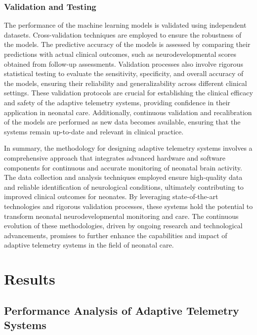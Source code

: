 \documentclass[12pt,journal,compsoc]{IEEEtran}
\begin{document}
\subsubsection{Validation and Testing}

The performance of the machine learning models is validated using independent datasets. Cross-validation techniques are employed to ensure the robustness of the models. The predictive accuracy of the models is assessed by comparing their predictions with actual clinical outcomes, such as neurodevelopmental scores obtained from follow-up assessments. Validation processes also involve rigorous statistical testing to evaluate the sensitivity, specificity, and overall accuracy of the models, ensuring their reliability and generalizability across different clinical settings. These validation protocols are crucial for establishing the clinical efficacy and safety of the adaptive telemetry systems, providing confidence in their application in neonatal care. Additionally, continuous validation and recalibration of the models are performed as new data becomes available, ensuring that the systems remain up-to-date and relevant in clinical practice.

In summary, the methodology for designing adaptive telemetry systems involves a comprehensive approach that integrates advanced hardware and software components for continuous and accurate monitoring of neonatal brain activity. The data collection and analysis techniques employed ensure high-quality data and reliable identification of neurological conditions, ultimately contributing to improved clinical outcomes for neonates. By leveraging state-of-the-art technologies and rigorous validation processes, these systems hold the potential to transform neonatal neurodevelopmental monitoring and care. The continuous evolution of these methodologies, driven by ongoing research and technological advancements, promises to further enhance the capabilities and impact of adaptive telemetry systems in the field of neonatal care.

\section{Results}

\subsection{Performance Analysis of Adaptive Telemetry Systems}
\end{document}
